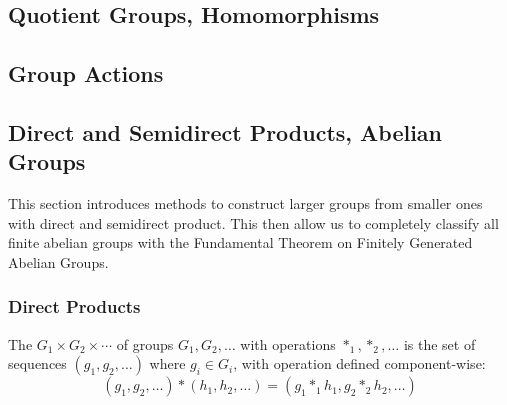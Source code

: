\begin{proposition}
\end{proposition}

\subsection{Quotient Groups, Homomorphisms}

\subsection{Group Actions}

\subsection{Direct and Semidirect Products, Abelian Groups}

This section introduces methods to construct larger groups from smaller ones with direct and semidirect product. This then allow us to completely classify all finite abelian groups with the Fundamental Theorem on Finitely Generated Abelian Groups.

\subsubsection{Direct Products}

\begin{definition}
The  $G_1 \times G_2 \times \cdots$ of groups $G_1, G_2, \ldots$ with operations $*_1, *_2, \ldots$ is the set of sequences $(g_1, g_2, \ldots)$ where $g_i \in G_i $, with operation defined component-wise:
\begin{equation}
(g_1, g_2, \ldots) * (h_1, h_2, \ldots) = (g_1 *_1 h_1, g_2 *_2 h_2, \ldots) \nonumber
\end{equation}
\end{definition}


